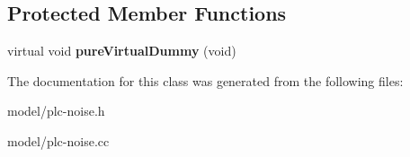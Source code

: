 \subsection*{\-Protected \-Member \-Functions}
\begin{DoxyCompactItemize}
\item 
\hypertarget{classns3_1_1PLC__ImpulseNoiseSource_a81d066efc456ef85ddd5117fab8493ec}{virtual void {\bfseries pure\-Virtual\-Dummy} (void)}\label{classns3_1_1PLC__ImpulseNoiseSource_a81d066efc456ef85ddd5117fab8493ec}

\end{DoxyCompactItemize}


\-The documentation for this class was generated from the following files\-:\begin{DoxyCompactItemize}
\item 
model/plc-\/noise.\-h\item 
model/plc-\/noise.\-cc\end{DoxyCompactItemize}
